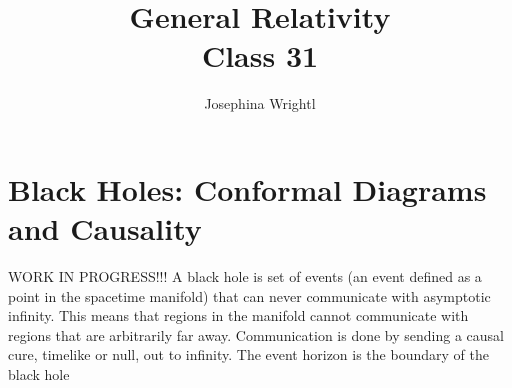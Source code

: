 \documentclass[10pt]{article}
\title{{\Huge General Relativity}\\{\Large{Class 31}}} %
\author{Josephina Wrightl}
\begin{document}
    \maketitle
    \flushbottom
    \newpage
    \pagestyle{fancynotes}
    \part{Black Holes: Conformal Diagrams and Causality}
WORK IN PROGRESS!!!
\newline A black hole is set of events (an event defined as a point in the spacetime manifold) that can never communicate with asymptotic infinity. This means that regions in the manifold cannot communicate with regions that are arbitrarily far away. Communication is done by sending a causal cure, timelike or null, out to infinity. 
	The event horizon is the boundary of the black hole
\end{document}
